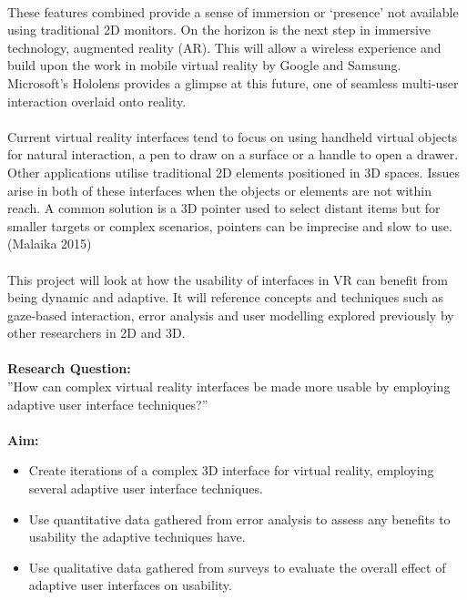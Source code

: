 \documentclass[11pt]{article}
\begin{document}
\paragraph{} 
These features combined provide a sense of immersion or ‘presence' not available using traditional 2D monitors. On the horizon is the next step in immersive technology, augmented reality (AR). This will allow a wireless experience and build upon the work in mobile virtual reality by Google and Samsung. Microsoft's Hololens provides a glimpse at this future, one of seamless multi-user interaction overlaid onto reality.

\paragraph{} 
Current virtual reality interfaces tend to focus on using handheld virtual objects for natural interaction, a pen to draw on a surface or a handle to open a drawer. Other applications utilise traditional 2D elements positioned in 3D spaces. Issues arise in both of these interfaces when the objects or elements are not within reach. A common solution is a 3D pointer used to select distant items but for smaller targets or complex scenarios, pointers can be imprecise and slow to use. (Malaika 2015)

\paragraph{} 
This project will look at how the usability of interfaces in VR can benefit from being dynamic and adaptive. It will reference concepts and techniques such as gaze-based interaction, error analysis and user modelling explored previously by other researchers in 2D and 3D.

\paragraph{} 
\textbf{Research Question:} \\
''How can complex virtual reality interfaces be made more usable by employing adaptive user interface techniques?''

\paragraph{} 
\textbf{Aim:}
\begin{itemize}
\item Create iterations of a complex 3D interface for virtual reality, employing several adaptive user interface techniques.
\item Use quantitative data gathered from error analysis to assess any benefits to usability the adaptive techniques have.
\item Use qualitative data gathered from surveys to evaluate the overall effect of adaptive user interfaces on usability.
\end{itemize}
\end{document}
